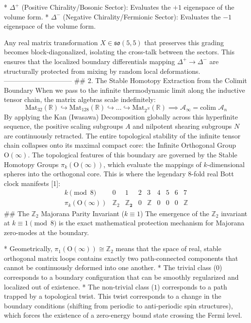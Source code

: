 * $\Delta^+$ (Positive Chirality/Bosonic Sector): Evaluates the $+1$ eigenspace of the volume form.
* $\Delta^-$ (Negative Chirality/Fermionic Sector): Evaluates the $-1$ eigenspace of the volume form.

Any real matrix transformation $X \in \mathfrak{so}(5,5)$ that preserves this grading becomes block-diagonalized, isolating the cross-talk between the sectors. This ensures that the localized boundary differentials mapping $\Delta^+ \to \Delta^-$ are structurally protected from mixing by random local deformations.
------------------------------
## 2. The Stable Homotopy Extraction from the Colimit Boundary
When we pass to the infinite thermodynamic limit along the inductive tensor chain, the matrix algebras scale indefinitely:
$$\text{Mat}_{32}(\mathbb{R}) \hookrightarrow \text{Mat}_{128}(\mathbb{R}) \hookrightarrow \dots \hookrightarrow \text{Mat}_{2^N}(\mathbb{R}) \implies \mathcal{A}_\infty = \text{colim }\mathcal{A}_n$$ 
By applying the Kan (Iwasawa) Decomposition globally across this hyperfinite sequence, the positive scaling subgroups $A$ and nilpotent shearing subgroups $N$ are continuously retracted. The entire topological stability of the infinite tensor chain collapses onto its maximal compact core: the Infinite Orthogonal Group $\text{O}(\infty)$.
The topological features of this boundary are governed by the Stable Homotopy Groups $\pi_k(\text{O}(\infty))$, which evaluate the mappings of $k$-dimensional spheres into the orthogonal core. This is where the legendary 8-fold real Bott clock manifests [1]:
$$\begin{array}{c|c|c|c|c|c|c|c|c} k \pmod 8 & 0 & 1 & 2 & 3 & 4 & 5 & 6 & 7 \\ \hline \pi_k(\text{O}(\infty)) & \mathbb{Z}_2 & \mathbf{\mathbb{Z}_2} & 0 & \mathbb{Z} & 0 & 0 & 0 & \mathbb{Z} \end{array}$$ 
## The $\mathbb{Z}_2$ Majorana Parity Invariant ($k \equiv 1$)
The emergence of the $\mathbb{Z}_2$ invariant at $k \equiv 1 \pmod 8$ is the exact mathematical protection mechanism for Majorana zero-modes at the boundary.

* Geometrically, $\pi_1(\text{O}(\infty)) \cong \mathbb{Z}_2$ means that the space of real, stable orthogonal matrix loops contains exactly two path-connected components that cannot be continuously deformed into one another.
* The trivial class ($0$) corresponds to a boundary configuration that can be smoothly regularized and localized out of existence.
* The non-trivial class ($1$) corresponds to a path trapped by a topological twist. This twist corresponds to a change in the boundary conditions (shifting from periodic to anti-periodic spin structures), which forces the existence of a zero-energy bound state crossing the Fermi level.

